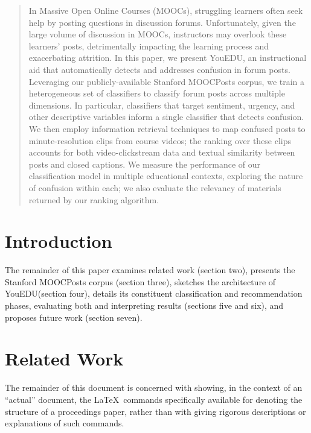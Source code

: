 \documentclass{edm_template}
\begin{document}
\maketitle
\begin{abstract}
In Massive Open Online Courses (MOOCs), struggling learners often seek help by
posting questions in discussion forums. Unfortunately, given the large volume of
discussion in MOOCs, instructors may overlook these learners' posts,
detrimentally impacting the learning process and exacerbating attrition. In this
paper, we present YouEDU, an instructional aid that automatically detects and
addresses confusion in forum posts. Leveraging our publicly-available Stanford
MOOCPosts corpus, we train a heterogeneous set of classifiers to classify forum
posts across multiple dimensions. In particular, classifiers that target
sentiment, urgency, and other descriptive variables inform a single classifier
that detects confusion. We then employ information retrieval techniques to map
confused posts to minute-resolution clips from course videos; the ranking over
these clips accounts for both video-clickstream data and textual similarity
between posts and closed captions. We measure the performance of our
classification model in multiple educational contexts, exploring the nature of
confusion within each; we also evaluate the relevancy of materials returned by
our ranking algorithm.
\end{abstract}

%


\section{Introduction}
The remainder of this paper examines related work (section two), presents the Stanford MOOCPosts corpus (section three), sketches the architecture of YouEDU(section four), details its constituent classification and recommendation phases, evaluating both and interpreting results (sections five and six), and proposes future work (section seven).

\section{Related Work}
The remainder of this document is concerned with showing, in
the context of an ``actual'' document, the \LaTeX\ commands
specifically available for denoting the structure of a
proceedings paper, rather than with giving rigorous descriptions
or explanations of such commands.
\end{document}

